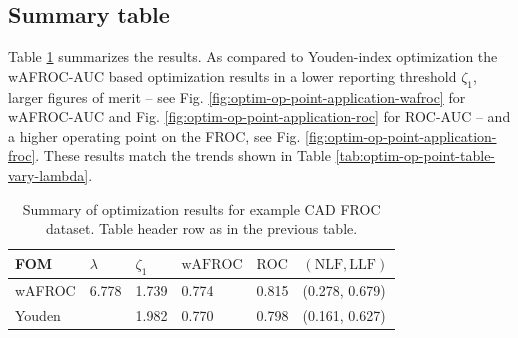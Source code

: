 \documentclass[
]{book}
\newenvironment{Shaded}{\begin{snugshade}}{\end{snugshade}}
\newcommand{\CommentTok}[1]{\textcolor[rgb]{0.56,0.35,0.01}{\textit{#1}}}
\newcommand{\DataTypeTok}[1]{\textcolor[rgb]{0.13,0.29,0.53}{#1}}
\newcommand{\DecValTok}[1]{\textcolor[rgb]{0.00,0.00,0.81}{#1}}
\newcommand{\KeywordTok}[1]{\textcolor[rgb]{0.13,0.29,0.53}{\textbf{#1}}}
\newcommand{\NormalTok}[1]{#1}
\newcommand{\OperatorTok}[1]{\textcolor[rgb]{0.81,0.36,0.00}{\textbf{#1}}}
\newcommand{\StringTok}[1]{\textcolor[rgb]{0.31,0.60,0.02}{#1}}
\begin{document}
\begin{Shaded}
\end{Shaded}

\hypertarget{summary-table-1}{%
\subsection{Summary table}\label{summary-table-1}}

Table \ref{tab:optim-op-point-table4} summarizes the results. As compared to Youden-index optimization the wAFROC-AUC based optimization results in a lower reporting threshold \(\zeta_1\), larger figures of merit -- see Fig. \ref{fig:optim-op-point-application-wafroc} for wAFROC-AUC and Fig. \ref{fig:optim-op-point-application-roc} for ROC-AUC -- and a higher operating point on the FROC, see Fig. \ref{fig:optim-op-point-application-froc}. These results match the trends shown in Table \ref{tab:optim-op-point-table-vary-lambda}.

\begin{table}

\caption{\label{tab:optim-op-point-table4}Summary of optimization results for example CAD FROC dataset. Table header row as in the previous table.}
\centering
\fontsize{10}{12}\selectfont
\begin{tabular}[t]{llllll}
\toprule
FOM & $\lambda$ & $\zeta_1$ & $\text{wAFROC}$ & $\text{ROC}$ & $\left( \text{NLF}, \text{LLF}\right)$\\
\midrule
wAFROC & 6.778 & 1.739 & 0.774 & 0.815 & (0.278, 0.679)\\
Youden &  & 1.982 & 0.770 & 0.798 & (0.161, 0.627)\\
\bottomrule
\end{tabular}
\end{table}
\end{document}
